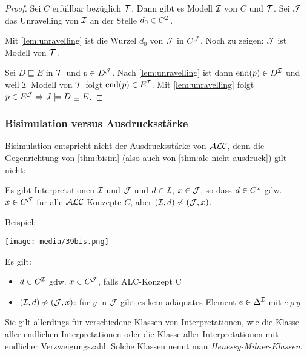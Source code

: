\begin{tafel}
\begin{proof}
Sei $C$ erfüllbar bezüglich $\mathcal{T}$. Dann gibt es Modell $\mathcal{I}$ von $C$ und $\mathcal{T}$. Sei $\mathcal{J}$ das Unravelling von $\mathcal{I}$ an der Stelle
$d_0 \in C^{\mathcal{I}}$.

Mit \autoref{lem:unravelling} ist die Wurzel $d_0$ von $\mathcal{J}$ in $C^{\mathcal{J}}$. Noch zu zeigen: $\mathcal{J}$ ist Modell von $\mathcal{T}$. 

Sei $D \sqsubseteq E$ in $\mathcal{T}$ und $p \in D^{\mathcal{J}}$. Nach
\autoref{lem:unravelling} ist dann $\text{end}\left( p \right) \in D^\MI$
und weil $\mathcal{I}$ Modell von $\mathcal{T}$ folgt $\text{end}\left( p \right) \in
E^\MI$. Mit \autoref{lem:unravelling} folgt $p \in E^{\mathcal{J}}
\Rightarrow J \models D \sqsubseteq E$. %
\end{proof}
\end{tafel}

\subsubsection{Bisimulation versus Ausdrucksstärke}\label{bisimulation-versus-ausdrucksstuxe4rke}

Bisimulation entspricht nicht der Ausdrucksstärke von $\mathcal{A}\mathcal{L}\mathcal{C}$, denn die Gegenrichtung von \autoref{thm:bisim} (also auch von \autoref{thm:alc-nicht-ausdruck}) gilt nicht:

Es gibt Interpretationen $\mathcal{I}$ und $\mathcal{J}$ und $d \in \mathcal{I}$, $x \in \mathcal{J}$, so dass $d \in C^{\mathcal{I}}$ gdw. $x \in C^{\mathcal{J}}$ für alle $\mathcal{A}\mathcal{L}\mathcal{C}$-Konzepte $C$, aber $(\mathcal{I},d) \not\sim (\mathcal{J},x)$. 

\begin{tafel}
Beispiel:

\texttt{[image: media/39bis.png]}

Es gilt:

\begin{itemize}
  \item $d \in C^{\mathcal{I}}$ gdw. $x \in C^{\mathcal{J}}$, falls ALC-Konzept C
  \item $(\mathcal{I},d) \not\sim (\mathcal{J},x)$: für $y$ in $\mathcal{J}$ gibt es kein adäquates Element $e \in \Delta^{\mathcal{I}}$ mit $e\ \rho\ y$
\end{itemize}
\end{tafel}

Sie gilt allerdings für verschiedene Klassen von Interpretationen, wie die Klasse aller endlichen Interpretationen oder die Klasse aller Interpretationen mit endlicher Verzweigungszahl. Solche Klassen nennt man \emph{Henessy-Milner-Klassen}.

